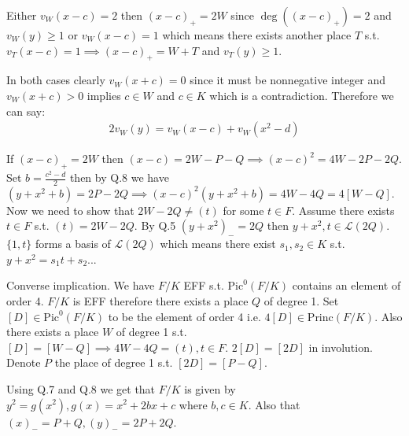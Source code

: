 \documentclass[12pt, a4paper]{article}
\begin{document}
Either $v_W(x-c) = 2$ then $(x-c)_{+}=2W$ since $\deg((x-c)_{+})=2$ and $v_W(y) \geq 1$ or $v_W(x-c)=1$ which means there exists another place $T$ s.t. $v_T(x-c)=1 \implies (x-c)_{+}=W+T$ and $v_T(y) \geq 1$.

In both cases clearly $v_W(x+c) = 0$ since it must be nonnegative integer and $v_W(x+c) > 0$ implies $c \in W$ and $c \in K$ which is a contradiction. Therefore we can say:
\begin{gather*}
2v_W(y) = v_W(x-c)+v_W(x^2-d)
\end{gather*}

If $(x-c)_{+} = 2W$ then $(x-c)=2W-P-Q \implies (x-c)^2 = 4W - 2P - 2Q$. Set $b = \frac{c^2-d}{2}$ then by Q.8 we have $(y+x^2+b)=2P-2Q \implies (x-c)^2(y+x^2+b) = 4W - 4Q = 4[W-Q]$. Now we need to show that $2W-2Q \neq (t)$ for some $t \in F$. Assume there exists $t \in F$ s.t. $(t) = 2W-2Q$. By Q.5 $(y+x^2)_{-}=2Q$ then $y+x^2, t \in \mathcal{L}(2Q)$. $\{1,t\}$ forms a basis of $\mathcal{L}(2Q)$ which means there exist $s_1,s_2 \in K$ s.t. $y+x^2 = s_1t +s_2$...

Converse implication. We have $F/K$ EFF s.t. $\text{Pic}^0(F/K)$ contains an element of order 4. $F/K$ is EFF therefore there exists a place $Q$ of degree 1. Set $[D] \in \text{Pic}^0(F/K)$ to be the element of order 4 i.e. $4[D] \in \text{Princ}(F/K)$. Also there exists a place $W$ of degree 1 s.t. $[D]=[W-Q] \implies 4W-4Q = (t), t \in F$. $2[D]=[2D]$ in involution. Denote $P$ the place of degree 1 s.t. $[2D] = [P-Q]$. 

Using Q.7 and Q.8 we get that $F/K$ is given by $y^2=g(x^2), g(x)=x^2+2bx+c$ where $b,c \in K$. Also that $(x)_{-}=P+Q, (y)_{-}=2P+2Q$.
\end{document}
